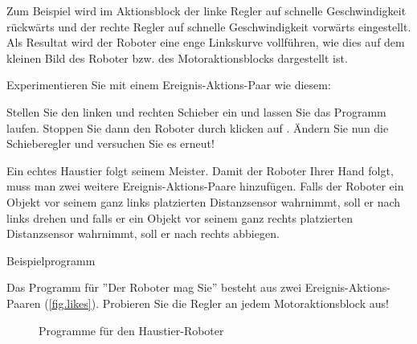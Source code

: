 Zum Beispiel wird im Aktionsblock  der linke Regler auf schnelle Geschwindigkeit rückwärts und der rechte Regler auf schnelle Geschwindigkeit vorwärts eingestellt.  Als Resultat wird der Roboter eine enge Linkskurve vollführen, wie dies auf dem kleinen Bild des Roboter bzw. des Motoraktionsblocks dargestellt ist.

Experimentieren Sie mit einem Ereignis-Aktions-Paar wie diesem: 

Stellen Sie den linken und rechten Schieber ein und lassen Sie das Programm laufen. Stoppen Sie dann den Roboter durch klicken auf . Ändern Sie nun die Schieberegler und versuchen Sie es erneut!

	

Ein echtes Haustier folgt seinem Meister. Damit der Roboter Ihrer Hand folgt,
muss man zwei weitere Ereignis-Aktions-Paare hinzufügen. Falls der Roboter ein Objekt vor seinem ganz links platzierten Distanzsensor wahrnimmt, soll er nach links drehen und falls er ein Objekt vor seinem ganz rechts platzierten Distanzsensor wahrnimmt, soll er nach rechts abbiegen.
                                                       
{\raggedleft \hfill Beispielprogramm }

Das Programm für ''Der Roboter mag Sie'' besteht aus zwei Ereignis-Aktions-Paaren (\cref{fig.likes}).
Probieren Sie die Regler an jedem Motoraktionsblock aus!

\begin{figure}
	\hfill
	\caption{Programme für den Haustier-Roboter}\label{fig.likes-hates}
\end{figure}




